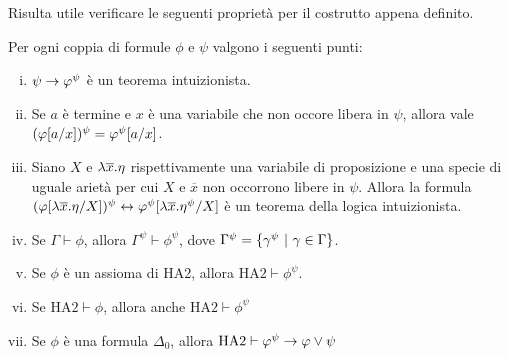 \documentclass[]{marticle}
\begin{document}
Risulta utile verificare le seguenti propriet\`a per il costrutto appena
definito.
\begin{block}[Lemma]
    \label{delta0}
    Per ogni coppia di formule $\phi$ e $\psi$ valgono i seguenti punti:
    \begin{enumerate}[(i)]
        \item $\psi\rightarrow \varphi^\psi$ \`e un teorema intuizionista.
        \item Se $a$ \`e termine e $x$ \`e una variabile che non occore libera
            in $\psi$, allora vale $(\varphi[a/x])^\psi = \varphi^\psi[a/x]$.
        \item Siano $X$ e $\lambda \overline{x}.\eta$ rispettivamente una variabile
            di proposizione e una specie di uguale ariet\`a per cui $X$ e
            $\overline{x}$ non occorrono libere in $\psi$. Allora la formula
            $(\varphi[\lambda \overline{x}.\eta/X])^\psi \leftrightarrow
            \varphi^\psi[\lambda \overline{x}.\eta^\psi/X] $ \`e un teorema della
            logica intuizionista.
        \item Se $\Gamma \vdash \phi$, allora $\Gamma^\psi \vdash \phi^\psi$,
            dove $\Gamma^\psi = \{\gamma^\psi \ |\  \gamma \in \Gamma\}$.
        \item Se $\phi$ \`e un assioma di HA2, allora $\text{HA2}\vdash
            \phi^\psi$.
        \item Se $\text{HA2}\vdash \phi$, allora anche $\text{HA2}\vdash
            \phi^\psi$
        \item Se $\phi$ \`e una formula $\Delta_0$, allora $\text{HA2} \vdash
            \varphi^\psi \rightarrow \varphi\lor \psi$
    \end{enumerate}
\end{block}
\end{document}
